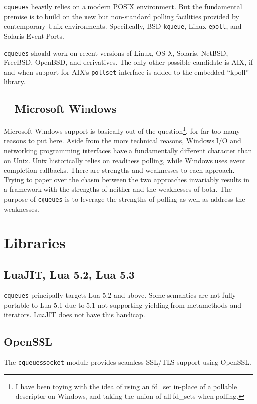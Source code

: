 \documentclass[11pt, oneside]{memoir}
\newcommand*{\cqueues}[0]{\texttt{cqueues}\xspace}
\newcommand*{\syscall}[1]{\texttt{#1}\xspace}
\newcommand*{\module}[1]{\texttt{#1}\xspace}
\begin{document}
\cqueues heavily relies on a modern POSIX environment. But the fundamental premise is to build on the new but non-standard polling facilities provided by contemporary Unix environments. Specifically, BSD \syscall{kqueue}, Linux \syscall{epoll}, and Solaris Event Ports.

\cqueues should work on recent versions of Linux, OS X, Solaris, NetBSD, FreeBSD, OpenBSD, and derivatives. The only other possible candidate is AIX, if and when support for AIX's \syscall{pollset} interface is added to the embedded ``kpoll'' library.

\subsection{$\lnot$ Microsoft Windows}

Microsoft Windows support is basically out of the question\footnote{I have been toying with the idea of using an fd\_set in-place of a pollable descriptor on Windows, and taking the union of all fd\_sets when polling.}, for far too many reasons to put here. Aside from the more technical reasons, Windows I/O and networking programming interfaces have a fundamentally different character than on Unix. Unix historically relies on readiness polling, while Windows uses event completion callbacks. There are strengths and weaknesses to each approach. Trying to paper over the chasm between the two approaches invariably results in a framework with the strengths of neither and the weaknesses of both. The purpose of \cqueues is to leverage the strengths of polling as well as address the weaknesses.

\section{Libraries}

\subsection{LuaJIT, Lua 5.2, Lua 5.3}
\cqueues principally targets Lua 5.2 and above. Some semantics are not fully portable to Lua 5.1 due to 5.1 not supporting yielding from metamethods and iterators. LuaJIT does not have this handicap.

\subsection{OpenSSL}
The \cqueues \module{socket} module provides seamless SSL/TLS support using OpenSSL.
\end{document}
